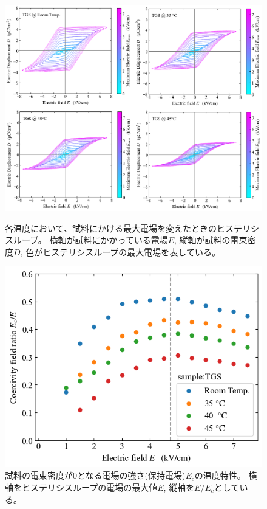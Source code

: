 \documentclass[11pt,dvipdfmx,a4paper]{jsarticle}
\begin{document}
\begin{figure}[H]
    \centering
    \begin{minipage}{0.58\columnwidth}
        \centering
        \includegraphics[width=\columnwidth]{TGS_D-E_temp.png}
        \caption{\small{各温度において、試料にかける最大電場を変えたときのヒステリシスループ。
        横軸が試料にかかっている電場\(E\), 縦軸が試料の電束密度\(D\), 色がヒステリシスループの最大電場を表している。}}
        \label{graph:TGS_D-E_Ec}
    \end{minipage}
    \hfill
    \begin{minipage}{0.4\columnwidth}
        \centering
        \includegraphics[width=\columnwidth]{TGS_Ec-E.png}
        \caption{\small{試料の電束密度が0となる電場の強さ(保持電場)\(E_c\)の温度特性。
        横軸をヒステリシスループの電場の最大値\(E\), 縦軸を\(E/E_c\)としている。}}
        \label{graph:TGS_Ec-E}
    \end{minipage}
\end{figure}
\end{document}
